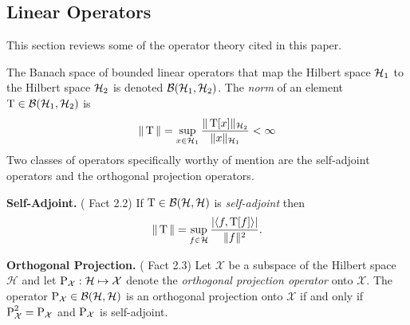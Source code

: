 {\subsection{Linear Operators\protect\footnotemark}
 }
This section reviews some of the operator theory cited in this
paper.

The Banach space of bounded linear operators that map the Hilbert
space %
$\Hone$ to the Hilbert space $\Htwo$ is denoted $\Banachonetwo$.
The \emph{norm} of an element $\T \in \Banachonetwo$ is
\[ 
\|\T \| = \sup_{x\in\Hone} \frac{\|\T[x]\|_{\Htwo}}{\|x\|_{\Hone}} < \infty
\]
Two classes of operators specifically worthy of mention are
the self-adjoint operators and the orthogonal projection operators.
\begin{define}{\bf Self-Adjoint. } (\cite{Teolis:1998} Fact 2.2)
If $\T \in \Banach$ is \emph{self-adjoint} then
\[ 
\|\T \| = \sup_{f\in\mathcal{H}} \frac{|\langle f,\T[f] \rangle|}{\|f\|^2}.
\]
\end{define}
\begin{define}{\bf Orthogonal Projection. } (\cite{Teolis:1998} Fact
2.3)
Let $\mathcal{X}$ be a subspace of the Hilbert space $\mathcal{H}$ and
let $\P_{\mathcal{X}}: \mathcal{H} \mapsto \mathcal{X}$ denote the
\emph{orthogonal projection operator} onto $\mathcal{X}$.  The operator
$\P_{\mathcal{X}}\in \Banach$ is an orthogonal projection 
onto $\mathcal{X}$ if and only if $\P^2_{\mathcal{X}} = \P_{\mathcal{X}}$
and $\P_{\mathcal{X}}$ is self-adjoint.
\end{define}

